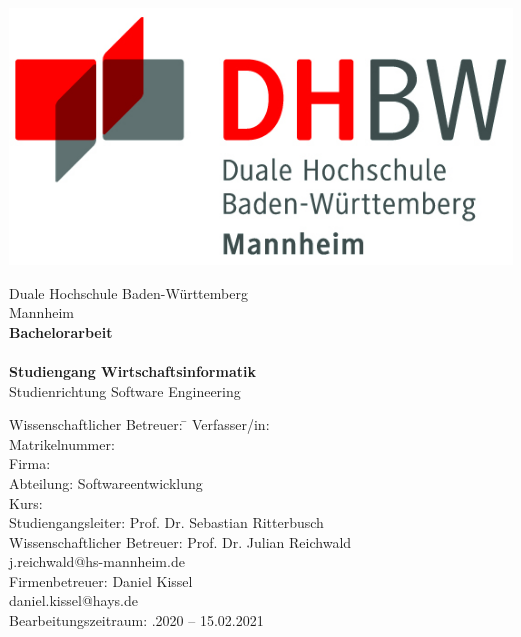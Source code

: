 \begin{titlepage}
\begin{minipage}{\textwidth}
		\vspace{-2cm}
		\noindent 
		\hfill   \includegraphics{img/logo.jpg}
\end{minipage}
\vspace{1em}
\sffamily
\begin{center}
	\textsf{\large{}Duale Hochschule Baden-W\"urttemberg\\[1.5mm] Mannheim}\\[2em]
	\textsf{\textbf{\Large{}Bachelorarbeit}}\\[3mm]
	\textsf{\textbf{\DerTitelDerArbeit}} \\[1.5cm]
	\textsf{\textbf{\Large{}Studiengang Wirtschaftsinformatik}\\[3mm] \textsf{Studienrichtung Software Engineering}}
	
	\vspace{3em}
\vfill

\begin{minipage}{\textwidth}

\begin{tabbing}
	Wissenschaftlicher Betreuer: \hspace{0.85cm}\=\kill
	Verfasser/in: \> \DerAutorDerArbeit \\[1.5mm]
	Matrikelnummer:  \\[1.5mm]
	Firma: \> \DerNameDerFirma  \\[1.5mm]
	Abteilung: \> Softwareentwicklung \\[1.5mm]
	Kurs: \> \DieKursbezeichnung \\[1.5mm]
	Studiengangsleiter: \> Prof. Dr. Sebastian Ritterbusch  \\[1.5mm]
	Wissenschaftlicher Betreuer: \> Prof. Dr. Julian Reichwald \\
	\> j.reichwald@hs-mannheim.de \\
	Firmenbetreuer: \> Daniel Kissel \\
	\> daniel.kissel@hays.de \\
	Bearbeitungszeitraum: .2020 -- 15.02.2021
\end{tabbing}
\end{minipage}

\end{center}

\end{titlepage}